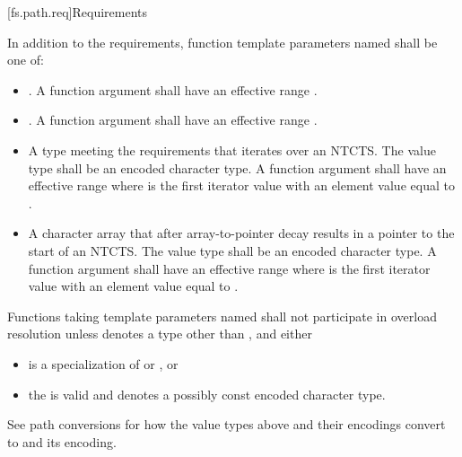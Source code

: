 [fs.path.req]{Requirements}

\pnum
In addition to the requirements,
function template parameters named 
shall be one of:
\begin{itemize}
\item {}. A function
  argument   shall have an
  effective range .
\item {}. A function
  argument   shall have an
  effective range .
\item A type meeting the  requirements that iterates over an NTCTS\@.
  The value type shall be an encoded character type. A function argument
    shall have an effective range
   where  is the first
  iterator value with an element value equal to
  .
\item A character array that after array-to-pointer decay results in a
  pointer to the start of an NTCTS\@. The value type shall be an encoded character type. A
  function argument   shall
  have an effective range  where
   is the first iterator value with an element value equal to
  .
\end{itemize}

\pnum
Functions taking template parameters named 
shall not participate in overload resolution unless
 denotes a type other than , and
either
\begin{itemize}
\item
{} is a specialization of
 or , or
\item
the   is valid and
denotes a possibly const encoded character type.
\end{itemize}

\pnum
\begin{note}
See path conversions
for how the value types above and their encodings convert to
 and its encoding.
\end{note}

